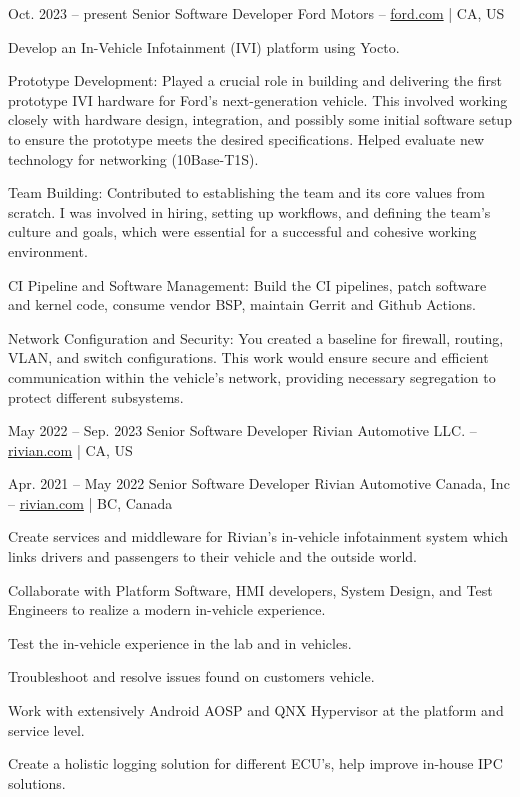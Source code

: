 \vspace*{6pt}


\entrys
{Oct. 2023 -- present}
{Senior Software Developer}
{Ford Motors -- \href{https://www.ford.com/}{ford.com} | CA, US}{
	Develop an In-Vehicle Infotainment (IVI) platform using Yocto.
	\begin{tightemize}
		\item Prototype Development: Played a crucial role in building and delivering the first prototype IVI hardware for Ford's next-generation vehicle. This involved working closely with hardware design, integration, and possibly some initial software setup to ensure the prototype meets the desired specifications. Helped evaluate new technology for networking (10Base-T1S).
		\item Team Building: Contributed to establishing the team and its core values from scratch. I was involved in hiring, setting up workflows, and defining the team's culture and goals, which were essential for a successful and cohesive working environment.
		\item CI Pipeline and Software Management: Build the CI pipelines, patch software and kernel code, consume vendor BSP, maintain Gerrit and Github Actions.
		\item Network Configuration and Security: You created a baseline for firewall, routing, VLAN, and switch configurations. This work would ensure secure and efficient communication within the vehicle's network, providing necessary segregation to protect different subsystems.
	\end{tightemize}
}

\tightentry
{May 2022 -- Sep. 2023}
{Senior Software Developer}
{Rivian Automotive LLC. -- \href{https://rivian.com/}{rivian.com} | CA, US}

\entrys
{Apr. 2021 -- May 2022}
{Senior Software Developer}
{Rivian Automotive Canada, Inc -- \href{https://rivian.com/}{rivian.com} | BC, Canada}{
	Create services and middleware for Rivian's in-vehicle infotainment system which links drivers and passengers to their vehicle and the outside world.
	\begin{tightemize}
		\item Collaborate with Platform Software, HMI developers, System Design, and Test Engineers to realize a modern in-vehicle experience.
		\item Test the in-vehicle experience in the lab and in vehicles.
		\item Troubleshoot and resolve issues found on customers vehicle.
		\item Work with extensively Android AOSP and QNX Hypervisor at the platform and service level.
		\item Create a holistic logging solution for different ECU's, help improve in-house IPC solutions.
	\end{tightemize}
}

